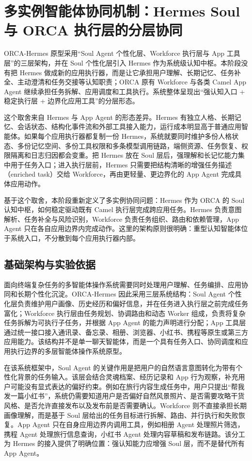 \section{多实例智能体协同机制：Hermes Soul 与 ORCA 执行层的分层协同}
\label{sec:rt3}

ORCA-Hermes 原型采用“Soul Agent 个性化层、Workforce 执行层与 App 工具层”的三层架构，并在 Soul 个性化层引入 Hermes 作为系统级认知中枢。本阶段没有把 Hermes 做成新的应用执行器，而是让它承担用户理解、长期记忆、任务补全、主动澄清和任务交接等认知职责；ORCA 原有 Workforce 与各类 Camel App Agent 继续承担任务拆解、应用调度和工具执行。系统整体呈现出“强认知入口 + 稳定执行层 + 边界化应用工具”的分层形态。

这个取舍来自 Hermes 与 App Agent 的形态差异。Hermes 有独立人格、长期记忆、会话状态、结构化事件流和外部工具接入能力，运行成本明显高于普通应用智能体。如果每个应用执行器都复制一份 Hermes，系统就要同时维护多份人格状态、多份记忆空间、多份工具权限和多条模型调用链路，端侧资源、任务恢复、权限隔离和日志归因都会变重。把 Hermes 放在 Soul 层后，强理解和长记忆能力集中用于任务入口；进入执行层前，Hermes 只需要把结构清晰的增强任务描述（enriched task）交给 Workforce，再由更轻量、更边界化的 App Agent 完成具体应用动作。

基于这个取舍，本阶段重新定义了多实例协同问题：Hermes 作为 ORCA 的 Soul 认知中枢，如何稳定驱动既有 Camel 执行层完成跨应用任务。Hermes 负责意图解析、任务补全与风险识别，Workforce 负责任务组织、路由和依赖管理，App Agent 只在各自应用边界内完成动作。这里的架构原则很明确：重型认知智能体位于系统入口，不分散到每个应用执行器内部。

\subsection{基础架构与实验依据}

面向终端复杂任务的多智能体操作系统需要同时处理用户理解、任务编排、应用协同和长期个性化沉淀。ORCA-Hermes 因此采用三层系统结构：Soul Agent 个性化层负责维护用户画像、历史经历和偏好信息，并在任务进入执行层之前完成任务富化；Workforce 执行层由任务规划、协调路由和动态 Worker 组成，负责将复杂任务拆解为可执行子任务，并根据 App Agent 的能力声明进行分配；App 工具层通过统一接口接入通讯录、备忘录、相册、浏览器、小红书、携程等原生或第三方应用能力。该结构并不是单一聊天智能体，而是一个具有任务入口、协同调度和应用执行边界的多层智能体操作系统原型。

在该系统框架中，Soul Agent 的关键作用是把用户的自然语言意图转化为带有个性化背景的任务输入。该层会结合灵魂档案、经历记录和 App 行为观察，补充用户可能没有显式表达的偏好约束。例如在旅行内容生成任务中，用户只提出“帮我发一篇小红书”，系统仍需要知道用户是否偏好自然风景照片、是否需要攻略干货风格、是否允许直接发布以及发布前是否需要确认。Workforce 则不直接承担长期画像理解，而是基于 Soul 层给出的任务目标进行拆解、路由、并行执行和失败恢复。App Agent 只在自身应用边界内调用工具，例如相册 Agent 处理照片筛选，携程 Agent 处理旅行信息查询，小红书 Agent 处理内容草稿和发布链路。该分工为 Hermes 的接入提供了明确位置：强认知能力应增强 Soul 层，而不是替代所有 App Agent。

